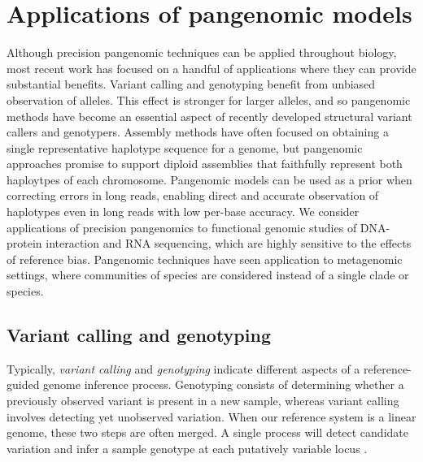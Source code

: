 \section{Applications of pangenomic models}

Although precision pangenomic techniques can be applied throughout biology, most recent work has focused on a handful of applications where they can provide substantial benefits.
Variant calling and genotyping benefit from unbiased observation of alleles.
This effect is stronger for larger alleles, and so pangenomic methods have become an essential aspect of recently developed structural variant callers and genotypers.
Assembly methods have often focused on obtaining a single representative haplotype sequence for a genome, but pangenomic approaches promise to support diploid assemblies that faithfully represent both haploytpes of each chromosome.
Pangenomic models can be used as a prior when correcting errors in long reads, enabling direct and accurate observation of haplotypes even in long reads with low per-base accuracy.
We consider applications of precision pangenomics to functional genomic studies of DNA-protein interaction and RNA sequencing, which are highly sensitive to the effects of reference bias.
Pangenomic techniques have seen application to metagenomic settings, where communities of species are considered instead of a single clade or species.

\subsection{Variant calling and genotyping}


Typically, \emph{variant calling} and \emph{genotyping} indicate different aspects of a reference-guided genome inference process.
Genotyping consists of determining whether a previously observed variant is present in a new sample, whereas variant calling involves detecting yet unobserved variation.
When our reference system is a linear genome, these two steps are often merged.
A single process will detect candidate variation and infer a sample genotype at each putatively variable locus \cite{Li_2011,Garrison_2012}.

